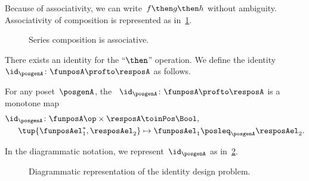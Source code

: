 Because of associativity, we can write~$f\then g\then h$ without ambiguity.
Associativity of composition is represented as in~\cref{fig:compositionassociativity}.

\begin{figure}[h!]
  \begin{center}
  \end{center}
  \caption{Series composition is associative. \label{fig:compositionassociativity}}
\end{figure}

There exists an identity for the ``$\then$'' operation.
We define the identity~$\id_\posgenA \colon \funposA \profto \resposA$ as follows.

\begin{definition}
  \label{def:dp-identity}
  For any poset~$\posgenA$, the \emph{}~$\id_\posgenA \colon \funposA \profto \resposA$ is a monotone map
  \begin{equation}
    \begin{aligned}
      \id_\posgenA \colon \funposA\op \times \resposA & \toinPos   \Bool, \label{eq:identity}\\
      \tup{\funposAel_1^*, \resposAel_2} & \mapsto \funposAel_1 \posleq_{\posgenA} \resposAel_2.
    \end{aligned}
  \end{equation}
\end{definition}
In the diagrammatic notation, we represent~$\id_\posgenA$ as in~\cref{fig:identitydp}.

\begin{figure}[h!]
  \begin{center}
  \end{center}
  \caption{Diagrammatic representation of the identity design problem. \label{fig:identitydp}}
\end{figure}


